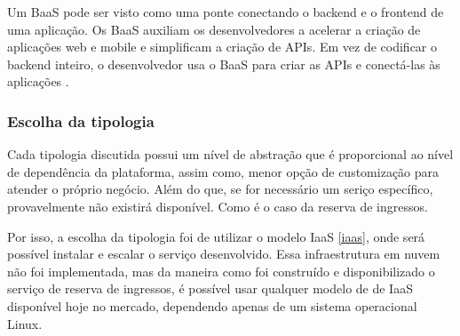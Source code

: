 \begin{citacao}
Um BaaS pode ser visto como uma ponte conectando o backend e o frontend de uma aplicação.
Os BaaS auxiliam os desenvolvedores a acelerar a criação de aplicações web e mobile e
simplificam a criação de APIs. Em vez de codificar o backend inteiro, o desenvolvedor usa
o BaaS para criar as APIs e conectá-las às aplicações \cite{backend-as-a-service-pros-e-contras}.
\end{citacao}

\subsubsection{Escolha da tipologia}

Cada tipologia discutida possui um nível de abstração que é proporcional ao nível de
dependência da plataforma, assim como, menor opção de customização para atender
o próprio negócio. Além do que, se for necessário um seriço específico, provavelmente
não existirá disponível. Como é o caso da reserva de ingressos.

Por isso, a escolha da tipologia foi de utilizar o modelo IaaS \autoref{iaas},
onde será possível instalar e escalar o serviço desenvolvido.
Essa infraestrutura em nuvem não foi implementada, mas da maneira como foi construído
e disponibilizado o serviço de reserva de ingressos, é possível usar qualquer modelo
de de IaaS disponível hoje no mercado, dependendo apenas de um sistema operacional
Linux.


